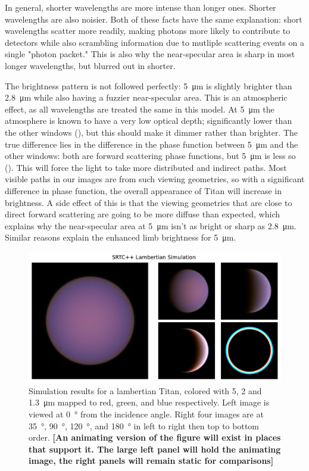 \documentclass[linenumbers]{aastex631}
\begin{document}
In general, shorter wavelengths are more intense than longer ones. Shorter wavelengths are also noisier. Both of these facts have the same explanation: short wavelengths scatter more readily, making photons more likely to contribute to detectors while also scrambling information due to mutliple scattering events on a single "photon packet." This is also why the near-specular area is sharp in most longer wavelengths, but blurred out in shorter.

The brightness pattern is not followed perfectly: \qty{5}{\micro\meter} is slightly brighter than \qty{2.8}{\micro\meter} while also having a fuzzier near-specular area. This is an atmospheric effect, as all wavelengths are treated the same in this model. At \qty{5}{\micro\meter} the atmosphere is known to have a very low optical depth; significantly lower than the other windows (\cite{EsSayeh2023}), but this should make it dimmer rather than brighter. The true difference lies in the difference in the phase function between \qty{5}{\micro\meter} and the other windows: both are forward scattering phase functions, but \qty{5}{\micro\meter} is less so (\cite{Tomasko2008}). This will force the light to take more distributed and indirect paths. Most visible paths in our images are from such viewing geometries, so with a significant difference in phase function, the overall appearance of Titan will increase in brightness. A side effect of this is that the viewing geometries that are close to direct forward scattering are going to be more diffuse than expected, which explains why the near-specular area at \qty{5}{\micro\meter} isn't as bright or sharp as \qty{2.8}{\micro\meter}. Similar reasons explain the enhanced limb brightness for \qty{5}{\micro\meter}.

\begin{figure}[htbp]
\includegraphics[scale = 0.5]{LambertianSim.pdf}
\centering
\caption{Simulation results for a lambertian Titan, colored with 5, 2 and \qty{1.3}{\micro\meter} mapped to red, green, and blue respectively. Left image is viewed at \qty{0}{\degree} from the incidence angle. Right four images are at  \qty{35}{\degree},  \qty{90}{\degree},  \qty{120}{\degree}, and  \qty{180}{\degree} in left to right then top to bottom order. \textbf{\color{red} [An animating version of the figure will exist in places that support it. The large left panel will hold the animating image, the right panels will remain static for comparisons] \color{black}}}
\label{fig:9}
\end{figure}
\end{document}
